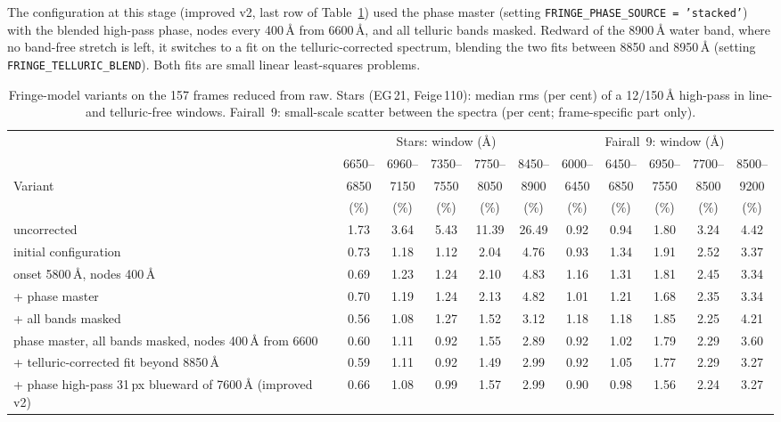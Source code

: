 The configuration at this stage (improved v2, last row of Table~\ref{tab:fringebench}) used the phase master
(setting \texttt{FRINGE\_PHASE\_SOURCE = 'stacked'}) with the blended high-pass phase, nodes every 400\,\AA{} from
6600\,\AA, and all telluric bands masked. Redward of the 8900\,\AA{} water band, where no band-free stretch is left,
it switches to a fit on the telluric-corrected spectrum, blending the two fits between 8850 and 8950\,\AA{} (setting
\texttt{FRINGE\_TELLURIC\_BLEND}). Both fits are small linear least-squares problems.

\begin{table}[!htbp]
\centering
\small
\caption{Fringe-model variants on the 157 frames reduced from raw. Stars (EG\,21, Feige\,110): median rms (per cent)
of a 12/150\,\AA{} high-pass in line- and telluric-free windows. Fairall~9: small-scale scatter between the
spectra (per cent; frame-specific part only).}
\label{tab:fringebench}
\footnotesize
\setlength{\tabcolsep}{3.2pt}
\begin{tabular}{@{}>{\raggedright\arraybackslash}p{3.7cm}ccccc|ccccc@{}}
\toprule
 & \multicolumn{5}{c|}{Stars: window (\AA)} & \multicolumn{5}{c}{Fairall~9: window (\AA)} \\
 & 6650-- & 6960-- & 7350-- & 7750-- & 8450-- & 6000-- & 6450-- & 6950-- & 7700-- & 8500-- \\
Variant & 6850 & 7150 & 7550 & 8050 & 8900 & 6450 & 6850 & 7550 & 8500 & 9200 \\
 & (\%) & (\%) & (\%) & (\%) & (\%) & (\%) & (\%) & (\%) & (\%) & (\%) \\
\midrule
uncorrected & 1.73 & 3.64 & 5.43 & 11.39 & 26.49 & 0.92 & 0.94 & 1.80 & 3.24 & 4.42 \\
initial configuration & 0.73 & 1.18 & 1.12 & 2.04 & 4.76 & 0.93 & 1.34 & 1.91 & 2.52 & 3.37 \\
onset 5800\,\AA, nodes 400\,\AA & 0.69 & 1.23 & 1.24 & 2.10 & 4.83 & 1.16 & 1.31 & 1.81 & 2.45 & 3.34 \\
\quad + phase master & 0.70 & 1.19 & 1.24 & 2.13 & 4.82 & 1.01 & 1.21 & 1.68 & 2.35 & 3.34 \\
\quad + all bands masked & 0.56 & 1.08 & 1.27 & 1.52 & 3.12 & 1.18 & 1.18 & 1.85 & 2.25 & 4.21 \\
phase master, all bands masked, nodes 400\,\AA{} from 6600 & 0.60 & 1.11 & 0.92 & 1.55 & 2.89 & 0.92 & 1.02 & 1.79 & 2.29 & 3.60 \\
\quad + telluric-corrected fit beyond 8850\,\AA & 0.59 & 1.11 & 0.92 & 1.49 & 2.99 & 0.92 & 1.05 & 1.77 & 2.29 & 3.27 \\
\quad + phase high-pass 31\,px blueward of 7600\,\AA{} (improved v2) & 0.66 & 1.08 & 0.99 & 1.57 & 2.99 & 0.90 & 0.98 & 1.56 & 2.24 & 3.27 \\
\bottomrule
\end{tabular}
\end{table}

